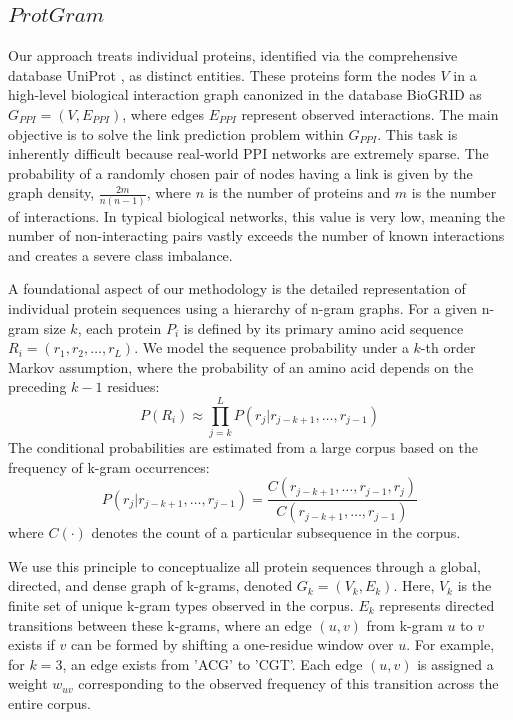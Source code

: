 \documentclass[utf8]{article}
\begin{document}
	\subsection{$ProtGram$}
	Our approach treats individual proteins, identified via the comprehensive database UniProt \cite{theuniprotconsortium_uniprotuniversalprotein_2023}, as distinct entities. These proteins form the nodes $V$ in a high-level biological interaction graph canonized in the database BioGRID \cite{oughtred_biogriddatabasecomprehensive_2021} as $G_{PPI}=(V,E_{PPI})$, where edges $E_{PPI}$ represent observed interactions. The main objective is to solve the link prediction problem within $G_{PPI}$. This task is inherently difficult because real-world PPI networks are extremely sparse. The probability of a randomly chosen pair of nodes having a link is given by the graph density, $\frac{2m}{n(n-1)}$, where $n$ is the number of proteins and $m$ is the number of interactions. In typical biological networks, this value is very low, meaning the number of non-interacting pairs vastly exceeds the number of known interactions and creates a severe class imbalance.
	
	A foundational aspect of our methodology is the detailed representation of individual protein sequences using a hierarchy of n-gram graphs. For a given n-gram size $k$, each protein $P_i$ is defined by its primary amino acid sequence $R_i = (r_1, r_2, \ldots, r_L)$. We model the sequence probability under a $k$-th order Markov assumption, where the probability of an amino acid depends on the preceding $k-1$ residues:
	$$ P(R_i) \approx \prod_{j=k}^{L} P(r_j | r_{j-k+1}, \dots, r_{j-1}) $$
	The conditional probabilities are estimated from a large corpus based on the frequency of k-gram occurrences:
	$$ P(r_j | r_{j-k+1}, \dots, r_{j-1}) = \frac{C(r_{j-k+1}, \dots, r_{j-1}, r_j)}{C(r_{j-k+1}, \dots, r_{j-1})} $$
	where $C(\cdot)$ denotes the count of a particular subsequence in the corpus.
	
	We use this principle to conceptualize all protein sequences through a global, directed, and dense graph of k-grams, denoted $G_{k}=(V_{k}, E_{k})$. Here, $V_{k}$ is the finite set of unique k-gram types observed in the corpus. $E_{k}$ represents directed transitions between these k-grams, where an edge $(u, v)$ from k-gram $u$ to $v$ exists if $v$ can be formed by shifting a one-residue window over $u$. For example, for $k=3$, an edge exists from 'ACG' to 'CGT'. Each edge $(u, v)$ is assigned a weight $w_{uv}$ corresponding to the observed frequency of this transition across the entire corpus.
	
\end{document}
